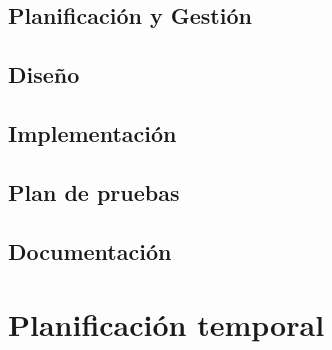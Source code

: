 \documentclass{report}
\begin{document}
        \section{Planificación y Gestión}
        \section{Diseño}
        \section{Implementación}
        \section{Plan de pruebas}
        \section{Documentación}
    \chapter{Planificación temporal} %
\end{document}

